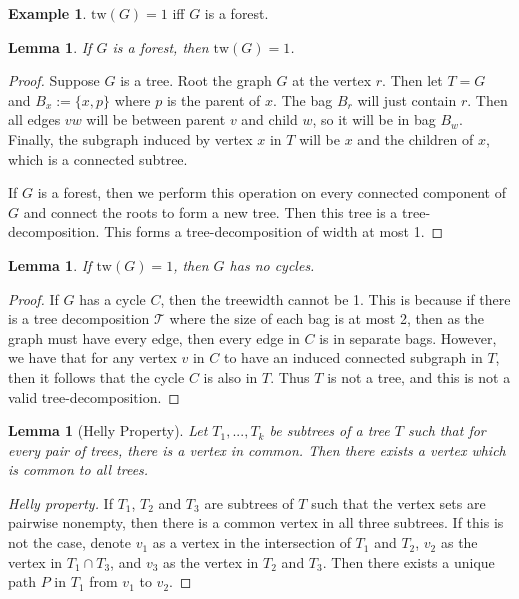 \documentclass[]{report}
\newcommand{\tree}{\mathcal{T}}
\newcommand{\tw}{\text{tw}}
\newtheorem{lemma}[theorem]{Lemma}
\theoremstyle{definition}
\newtheorem{example}[theorem]{Example}
\numberwithin{theorem}{section}
\numberwithin{equation}{section}
\begin{document}
\begin{example}\label{ex:treewidth_forest}
	$\tw(G) = 1$ iff $G$ is a forest.
	\begin{lemma}
		If $G$ is a forest, then $\tw(G) = 1$.
	\end{lemma}
	\begin{proof}
		Suppose $G$ is a tree. Root the graph $G$ at the vertex $r$. Then let $T = G$ and $B_x:= \lbrace x, p \rbrace$ where $p$ is the parent of $x$. The bag $B_r$ will just contain $r$. Then all edges $vw$ will be between parent $v$ and child $w$, so it will be in bag $B_w$. Finally, the subgraph induced by vertex $x$ in $T$ will be $x$ and the children of $x$, which is a connected subtree.
		
		If $G$ is a forest, then we perform this operation on every connected component of $G$ and connect the roots to form a new tree. Then this tree is a tree-decomposition. This forms a tree-decomposition of width at most 1. 
	\end{proof}
	\begin{lemma}
		If $\tw(G) = 1$, then $G$ has no cycles.
	\end{lemma}
	\begin{proof}
		If $G$ has a cycle $C$, then the treewidth cannot be 1. This is because if there is a tree decomposition $\tree$ where the size of each bag is at most 2, then as the graph must have every edge, then every edge in $C$ is in separate bags. However, we have that for any vertex $v$ in $C$ to have an induced connected subgraph in $T$, then it follows that the cycle $C$ is also in $T$. Thus $T$ is not a tree, and this is not a valid tree-decomposition. 
	\end{proof}
\end{example}

\begin{lemma}[Helly Property]\label{lem:Helly}
	Let $T_1, ..., T_k$ be subtrees of a tree $T$ such that for every pair of trees, there is a vertex in common. Then there exists a vertex which is common to all trees.
\end{lemma}
\begin{proof}[Helly property]
	If $T_1$, $T_2$ and $T_3$ are subtrees of $T$ such that the vertex sets are pairwise nonempty, then there is a common vertex in all three subtrees. If this is not the case, denote $v_1$ as a vertex in the intersection of $T_1$ and $T_2$, $v_2$ as the vertex in $T_1 \cap T_3$, and $v_3$ as the vertex in $T_2$ and $T_3$. Then there exists a unique path $P$ in $T_1$ from $v_1$ to $v_2$.
\end{proof}
\end{document}
